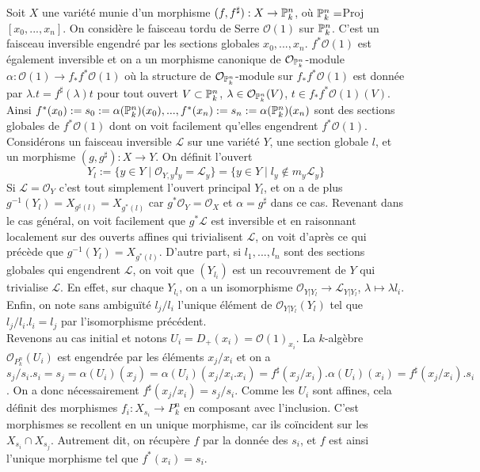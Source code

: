 Soit $X$ une variété munie d'un morphisme $(f,f^\sharp):X\rightarrow \mathbb{P}^n_k$, où $\mathbb{P}^n_k=$Proj$[x_0,...,x_n]$. On considère le faisceau tordu de Serre $\mathcal{O}(1)$ sur $\mathbb{P}^n_k$. C'est un faisceau inversible engendré par les sections globales $x_0,...,x_n$. $f^*\mathcal{O}(1)$ est également inversible et on a un morphisme canonique de $\mathcal{O}_{\mathbb{P}^n_k}$-module $\alpha:\mathcal{O}(1)\rightarrow f_*f^*\mathcal{O}(1)$ où la structure de $\mathcal{O}_{\mathbb{P}^n_k}$-module sur $f_*f^*\mathcal{O}(1)$ est donnée par $\lambda.t=f^\sharp(\lambda)t$ pour tout ouvert $V\subset \mathbb{P}^n_k$, $\lambda\in \mathcal{O}_{\mathbb{P}^n_k}(V)$, $t\in f_*f^*\mathcal{O}(1)(V)$. Ainsi $f^*(x_0):=s_0:=\alpha(\mathbb{P}^n_k)(x_0),...,f^*(x_n):=s_n:=\alpha(\mathbb{P}^n_k)(x_n)$ sont des sections globales de $f^*\mathcal{O}(1)$ dont on voit facilement qu'elles engendrent $f^*\mathcal{O}(1)$.\\
Considérons un faisceau inversible $\mathcal{L}$ sur une variété $Y$, une section globale $l$, et un morphisme $(g,g^\sharp):X\rightarrow Y$. On définit l'ouvert $$Y_l:=\lbrace y\in Y\mid \mathcal{O}_{Y,y}l_y=\mathcal{L}_y\rbrace=\lbrace y\in Y\mid l_y\notin m_y\mathcal{L}_y\rbrace$$
Si $\mathcal{L}=\mathcal{O}_Y$ c'est tout simplement l'ouvert principal $Y_l$, et on a de plus $g^{-1}(Y_l)=X_{g^\sharp(l)}=X_{g^*(l)}$ car $g^*\mathcal{O}_Y=\mathcal{O}_X$ et $\alpha=g^\sharp$ dans ce cas. Revenant dans le cas général, on voit facilement que $g^*\mathcal{L}$ est inversible et en raisonnant localement sur des ouverts affines qui trivialisent $\mathcal{L}$, on voit d'après ce qui précède que $g^{-1}(Y_l)=X_{g^*(l)}$. D'autre part, si $l_1,...,l_n$ sont des sections globales qui engendrent $\mathcal{L}$, on voit que $(Y_{l_i})$ est un recouvrement de $Y$ qui trivialise $\mathcal{L}$. En effet, sur chaque $Y_{l_i}$, on a un isomorphisme $\mathcal{O}_{Y|Y_l}\rightarrow \mathcal{L}_{Y|Y_l}$, $\lambda \mapsto \lambda l_i$. Enfin, on note sans ambiguïté $l_j/l_i$ l'unique élément de $\mathcal{O}_{Y|Y_l}(Y_l)$ tel que $l_j/l_i.l_i=l_j$ par l'isomorphisme précédent.\\
Revenons au cas initial et notons $U_i=D_+(x_i)=\mathcal{O}(1)_{x_i}$. La $k$-algèbre $\mathcal{O}_{P^n_k}(U_i)$ est engendrée par les éléments $x_j/x_i$ et on a $s_j/s_i.s_i=s_j=\alpha(U_i)(x_j)=\alpha(U_i)(x_j/x_i.x_i)=f^\sharp(x_j/x_i).\alpha(U_i)(x_i)=f^\sharp(x_j/x_i).s_i$. On a donc nécessairement $f^\sharp(x_j/x_i)=s_j/s_i$. Comme les $U_i$ sont affines, cela définit des morphismes $f_i:X_{s_i}\rightarrow P^n_k$ en composant avec l'inclusion. C'est morphismes se recollent en un unique morphisme, car ils coïncident sur les $X_{s_i}\cap X_{s_j}$. Autrement dit, on récupère $f$ par la donnée des $s_i$, et $f$ est ainsi l'unique morphisme tel que $f^*(x_i)=s_i$.\\
